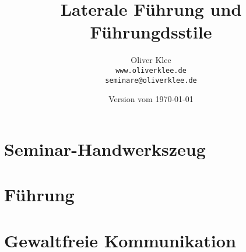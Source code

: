 \documentclass[a4paper,openany,twoside,titlepage,10pt,headsepline]{scrbook}
\title{Laterale Führung und Führungdsstile}
\author{Oliver Klee\\\texttt{www.oliverklee.de}\\\texttt{seminare@oliverklee.de}}
\date{Version vom \today}
\begin{document}
\frontmatter

\maketitle

\tableofcontents


\mainmatter

\chapter{Seminar-Handwerkszeug}





\chapter{Führung}











\chapter{Gewaltfreie Kommunikation}




\backmatter





\printindex
\end{document}
